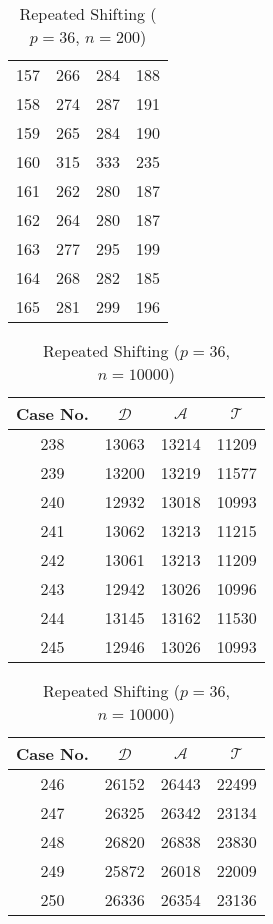 \begin{table}[!htb]
{\begin{tabular}{|c|c|c|c|}
157 & 266 & 284 & 188 \\
158 & 274 & 287 & 191 \\
159 & 265 & 284 & 190 \\
160 & 315 & 333 & 235 \\
161 & 262 & 280 & 187 \\
162 & 264 & 280 & 187 \\
163 & 277 & 295 & 199 \\
164 & 268 & 282 & 185 \\
165 & 281 & 299 & 196 \\
\hline
\end{tabular}
\caption{Repeated Shifting ($p=36$, $n=200$)}
\label{tab:dat-20}
}
\end{table}


\begin{table}[!hb]
\parbox{.45\linewidth}{
\centering
\begin{tabular}{|c|c|c|c|}
\hline
Case No. & $\mathcal{D}$ & $\mathcal{A}$ & $\mathcal{T}$ \\
\hline
238 & 13063 & 13214 & 11209 \\
239 & 13200 & 13219 & 11577 \\
240 & 12932 & 13018 & 10993 \\
241 & 13062 & 13213 & 11215 \\
242 & 13061 & 13213 & 11209 \\
243 & 12942 & 13026 & 10996 \\
244 & 13145 & 13162 & 11530 \\
245 & 12946 & 13026 & 10993 \\
\hline
\end{tabular}
\caption{Repeated Shifting ($p=36$, $n=5000$)}
\label{tab:dat-20}
}
\hfill
\parbox{.45\linewidth}{
\centering
\begin{tabular}{|c|c|c|c|}
\hline
Case No. & $\mathcal{D}$ & $\mathcal{A}$ & $\mathcal{T}$ \\
\hline
246 & 26152 & 26443 & 22499 \\
247 & 26325 & 26342 & 23134 \\
248 & 26820 & 26838 & 23830 \\
249 & 25872 & 26018 & 22009 \\
250 & 26336 & 26354 & 23136 \\
\hline
\end{tabular}
\caption{Repeated Shifting ($p=36$, $n=10000$)}
\label{tab:dat-20}
}
\end{table}

